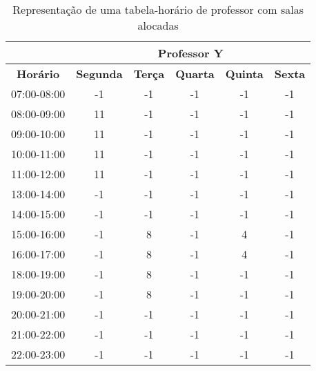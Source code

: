\begin{table}
\centering
\begin{tabular}{|c|c|c|c|c|c|}
\hline
\textbf{} & \multicolumn{5}{c|}{\textbf{Professor Y}} \\ \hline
\textbf{Horário} & \textbf{Segunda} & \textbf{Terça} & \textbf{Quarta} & \textbf{Quinta} & \textbf{Sexta} \\ \hline
07:00-08:00 & -1  & -1  & -1  & -1  & -1  \\ \hline
08:00-09:00 & \cellcolor[HTML]{C0C0C0}11  & -1  & -1  & -1  & -1  \\ \hline
09:00-10:00 & \cellcolor[HTML]{C0C0C0}11  & -1  & -1  & -1  & -1  \\ \hline
10:00-11:00 & \cellcolor[HTML]{C0C0C0}11  & -1  & -1  & -1  & -1  \\ \hline
11:00-12:00 & \cellcolor[HTML]{C0C0C0}11  & -1  & -1  & -1  & -1  \\ \hline
13:00-14:00 & -1  & -1  & -1  & -1  & -1  \\ \hline
14:00-15:00 & -1  & -1  & -1  & -1  & -1  \\ \hline
15:00-16:00 & -1  &  \cellcolor[HTML]{C0C0C0}8  & -1  &  \cellcolor[HTML]{C0C0C0}4  & -1  \\ \hline
16:00-17:00 & -1  &  \cellcolor[HTML]{C0C0C0}8  & -1  &  \cellcolor[HTML]{C0C0C0}4  & -1  \\ \hline
18:00-19:00 & -1  &  \cellcolor[HTML]{C0C0C0}8  & -1  & -1  & -1  \\ \hline
19:00-20:00 & -1  &  \cellcolor[HTML]{C0C0C0}8  & -1  & -1  & -1  \\ \hline
20:00-21:00 & -1  & -1  & -1  & -1  & -1  \\ \hline
21:00-22:00 & -1  & -1  & -1  & -1  & -1  \\ \hline
22:00-23:00 & -1  & -1  & -1  & -1  & -1  \\ \hline
\end{tabular}
\caption{Representação de uma tabela-horário de professor com salas alocadas}
\label{tbl_prof}
\end{table}

